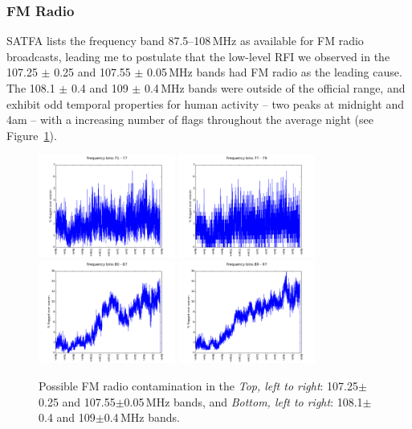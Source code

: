 \subsubsection*{FM Radio}

SATFA lists the frequency band 87.5--108\,MHz as available for FM radio broadcasts, leading me to postulate that the low-level RFI we observed in the 107.25	$\pm$	0.25 and 107.55	$\pm$	0.05\,MHz bands had FM radio as the leading cause. The 108.1	$\pm$	0.4 and 109	$\pm$	0.4\,MHz bands were outside of the official range, and exhibit odd temporal properties for human activity -- two peaks at midnight and 4am -- with a increasing number of flags throughout the average night (see Figure~\ref{fig:rfi_psa128_FMradio}). \\

\begin{figure}[h!]
\centering
\includegraphics[width=0.4\textwidth]{chapters/data_processing/figures/FB_71_77.png}
\includegraphics[width=0.4\textwidth]{chapters/data_processing/figures/FB_77_79.png}
\includegraphics[width=0.4\textwidth]{chapters/data_processing/figures/FB_80_87.png}
\includegraphics[width=0.4\textwidth]{chapters/data_processing/figures/FB_89_97.png}
\caption[Possible FM radio contamination.]{Possible FM radio contamination in the \textit{Top, left to right}: 107.25$\pm$0.25 and 107.55$\pm$0.05\,MHz bands, and \textit{Bottom, left to right}: 108.1$\pm$0.4 and 109$\pm$0.4\,MHz bands.}
\label{fig:rfi_psa128_FMradio}
\end{figure}

